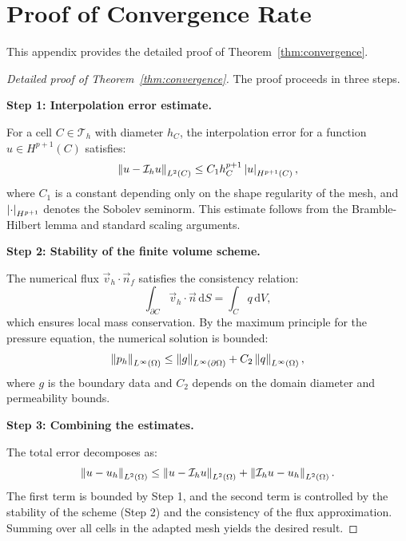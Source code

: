 \chapter{Proof of Convergence Rate}
\label{app:convergence_proof}

This appendix provides the detailed proof of Theorem~\ref{thm:convergence}.

\begin{proof}[Detailed proof of Theorem~\ref{thm:convergence}]
The proof proceeds in three steps.

\textbf{Step 1: Interpolation error estimate.}

For a cell $C \in \mathcal{T}_h$ with diameter $h_C$, the interpolation error for a function $u \in H^{p+1}(C)$ satisfies:
\begin{equation}
    \left\| u - \mathcal{I}_h u \right\|_{L^2(C)} \leq C_1 h_C^{p+1} \left| u \right|_{H^{p+1}(C)},
    \label{eq:app_interp}
\end{equation}
where $C_1$ is a constant depending only on the shape regularity of the mesh, and $\left| \cdot \right|_{H^{p+1}}$ denotes the Sobolev seminorm. This estimate follows from the Bramble-Hilbert lemma and standard scaling arguments.

\textbf{Step 2: Stability of the finite volume scheme.}

The numerical flux $\vec{v}_h \cdot \vec{n}_f$ satisfies the consistency relation:
\begin{equation}
    \int_{\partial C} \vec{v}_h \cdot \vec{n} \, \mathrm{d}S = \int_C q \, \mathrm{d}V,
    \label{eq:app_consistency}
\end{equation}
which ensures local mass conservation. By the maximum principle for the pressure equation, the numerical solution is bounded:
\begin{equation}
    \left\| p_h \right\|_{L^\infty(\Omega)} \leq \left\| g \right\|_{L^\infty(\partial\Omega)} + C_2 \left\| q \right\|_{L^\infty(\Omega)},
    \label{eq:app_maximum}
\end{equation}
where $g$ is the boundary data and $C_2$ depends on the domain diameter and permeability bounds.

\textbf{Step 3: Combining the estimates.}

The total error decomposes as:
\begin{equation}
    \left\| u - u_h \right\|_{L^2(\Omega)} \leq \left\| u - \mathcal{I}_h u \right\|_{L^2(\Omega)} + \left\| \mathcal{I}_h u - u_h \right\|_{L^2(\Omega)}.
    \label{eq:app_decompose}
\end{equation}
The first term is bounded by Step 1, and the second term is controlled by the stability of the scheme (Step 2) and the consistency of the flux approximation. Summing over all cells in the adapted mesh yields the desired result.
\end{proof}

